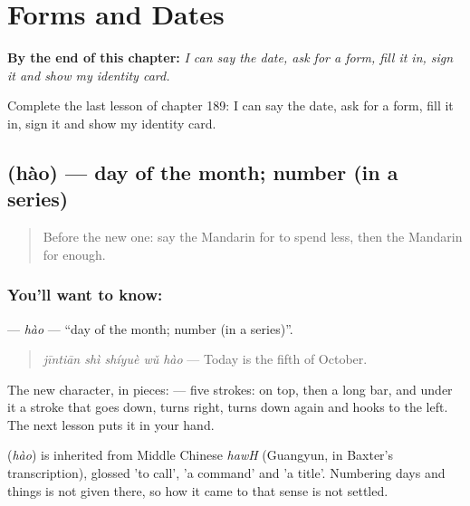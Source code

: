 
\chapter{Forms and Dates}
\label{ch:zh-forms-and-dates}

\begin{chapteropening}
\textbf{By the end of this chapter:} \emph{I can say the date, ask for a form, fill it in, sign it and show my identity card.}

Complete the last lesson of chapter 189: I can say the date, ask for a form, fill it in, sign it and show my identity card.
\end{chapteropening}

\section[\texorpdfstring{\zh{号} (hào)}{号 (hào)}]{ (hào) — day of the month; number (in a series)}

\label{lesson:ZH-C189-hao}



\begin{quote}
Before the new one: say the Mandarin for to spend less, then the Mandarin for enough.
\end{quote}

\subsection*{You'll want to know: }
\textbf{} — \emph{hào} — \textquotedblleft{}day of the month; number (in a series)\textquotedblright{}.

\begin{quote}
\textbf{} \emph{jīntiān shì shíyuè wǔ hào} — Today is the fifth of October.
\end{quote}

The new character, in pieces:  — five strokes:  on top, then a long bar, and under it a stroke that goes down, turns right, turns down again and hooks to the left. The next lesson puts it in your hand.

\begin{cousinweb}
\textbf{} (\emph{hào}) is inherited from Middle Chinese \emph{hawH} (Guangyun, in Baxter's transcription), glossed 'to call', 'a command' and 'a title'. Numbering days and things is not given there, so how it came to that sense is not settled.
\end{cousinweb}

